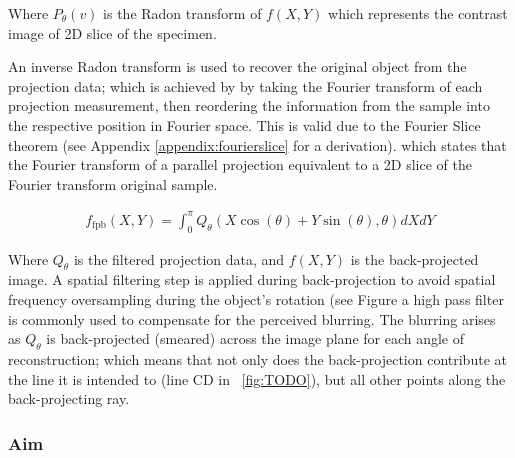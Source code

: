 Where $P_\theta(v)$ is the Radon transform of $f(X,Y)$ which represents the contrast image of \gls{2D} slice of the specimen.

An inverse Radon transform is used to recover the original object from the projection data; which is achieved by by taking the Fourier transform of each projection measurement, then reordering the information from the sample into the respective position in Fourier space.
This is valid due to the Fourier Slice theorem (see Appendix \ref{appendix:fourierslice} for a derivation)\cite{Fourier slice theorem}.%
which states that the \gls{Fourier transform} of a parallel projection equivalent to a 2D slice of the Fourier transform original sample.


\begin{align}
f_{\text{fpb}}(X,Y) = \int_{0}^{\pi} Q_\theta (X\cos(\theta)+Y\sin(\theta),\theta)dXdY
\end{align}

Where $Q_\theta$ is the filtered projection data, and $f(X,Y)$ is the back-projected image.
A spatial filtering step is applied during back-projection to avoid spatial frequency oversampling during the object’s rotation (see Figure %
a high pass filter is commonly used to compensate for the perceived blurring.
The blurring arises as \(Q_\theta\) is back-projected (smeared) across the \gls{image plane} for each angle of reconstruction; which means that not only does the back-projection contribute at the line it is intended to (line CD in \figurename~\ref{fig:TODO}), but all other points along the back-projecting ray.

\subsubsection{Aim}

